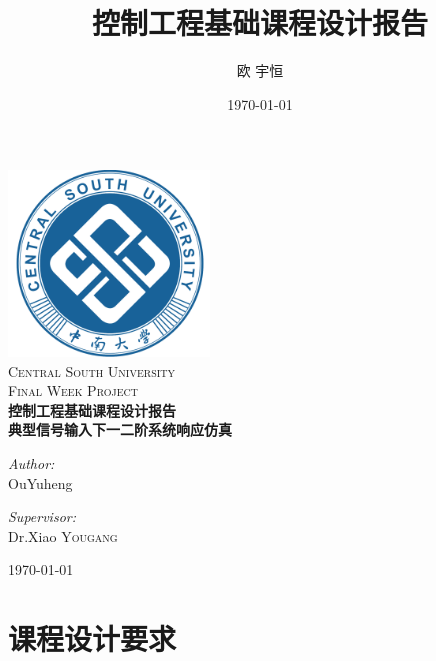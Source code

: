 \documentclass[12pt]{ctexart}
\title{控制工程基础课程设计报告}
\author{欧 宇恒}
\date{\today}
\begin{document}
	
\begin{titlepage}

    \begin{center}
    \includegraphics[width=0.4\textwidth]{./CSU.png}\\[1cm]    
    \textsc{\LARGE Central South University}\\[1.5cm]
    \textsc{\Large Final Week Project}\\[1.5cm]
    \textsc{\huge \bfseries 控制工程基础课程设计报告}\\[1cm]
    \textsc{ \bfseries 典型信号输入下一二阶系统响应仿真}\\[1.5cm]
    \begin{minipage}{0.4\textwidth}
    \begin{flushleft} \large
    \emph{Author:}\\
    OuYuheng
    \end{flushleft}
    \end{minipage}
    \begin{minipage}{0.4\textwidth}
    \begin{flushright} \large
    \emph{Supervisor:} \\
    Dr.Xiao \textsc{Yougang}
    \end{flushright}
    \end{minipage}
    \vfill
    {\large \today}
    \end{center}
    \end{titlepage}
\newpage
\tableofcontents
\newpage

\section{课程设计要求}
\end{document}
